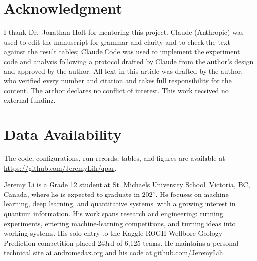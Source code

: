 \documentclass{ieeeaccess}
\begin{document}
\section*{Acknowledgment}
I thank Dr.~Jonathan Holt for mentoring this project. Claude (Anthropic) was used to edit the manuscript for grammar and clarity and to check the text against the result tables; Claude Code was used to implement the experiment code and analysis following a protocol drafted by Claude from the author's design and approved by the author. All text in this article was drafted by the author, who verified every number and citation and takes full responsibility for the content. The author declares no conflict of interest. This work received no external funding.

\section*{Data Availability}
The code, configurations, run records, tables, and figures are available at \url{https://github.com/JeremyLih/qpar}.




\begin{IEEEbiographynophoto}{Jeremy Li}
is a Grade 12 student at St. Michaels University School, Victoria, BC, Canada, where he is expected to graduate in 2027. He focuses on machine learning, deep learning, and quantitative systems, with a growing interest in quantum information. His work spans research and engineering: running experiments, entering machine-learning competitions, and turning ideas into working systems. His solo entry to the Kaggle ROGII Wellbore Geology Prediction competition placed 243rd of 6,125 teams. He maintains a personal technical site at andromedax.org and his code at github.com/JeremyLih.
\end{IEEEbiographynophoto}

\EOD
\end{document}
